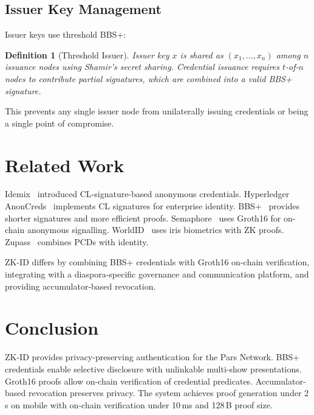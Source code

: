 \documentclass[11pt,a4paper]{article}
\newtheorem{definition}{Definition}[section]
\begin{document}
\subsection{Issuer Key Management}

Issuer keys use threshold BBS+:

\begin{definition}[Threshold Issuer]
    Issuer key $x$ is shared as $(x_1, \ldots, x_n)$ among $n$ issuance
    nodes using Shamir's secret sharing.  Credential issuance requires
    $t$-of-$n$ nodes to contribute partial signatures, which are combined
    into a valid BBS+ signature.
\end{definition}

This prevents any single issuer node from unilaterally issuing credentials
or being a single point of compromise.

\section{Related Work}
\label{sec:related}

Idemix~\cite{camenisch2001efficient} introduced CL-signature-based
anonymous credentials.  Hyperledger AnonCreds~\cite{hyperledger2023anoncreds}
implements CL signatures for enterprise identity.
BBS+~\cite{au2006constant} provides shorter signatures and more efficient
proofs.  Semaphore~\cite{semaphore2020} uses Groth16 for on-chain anonymous
signalling.  WorldID~\cite{worldcoin2023} uses iris biometrics with ZK
proofs.  Zupass~\cite{zupass2023} combines PCDs with identity.

ZK-ID differs by combining BBS+ credentials with Groth16 on-chain
verification, integrating with a diaspora-specific governance and
communication platform, and providing accumulator-based revocation.

\section{Conclusion}
\label{sec:conclusion}

ZK-ID provides privacy-preserving authentication for the Pars Network.
BBS+ credentials enable selective disclosure with unlinkable multi-show
presentations.  Groth16 proofs allow on-chain verification of credential
predicates.  Accumulator-based revocation preserves privacy.  The system
achieves proof generation under 2\,s on mobile with on-chain verification
under 10\,ms and 128\,B proof size.
\end{document}
